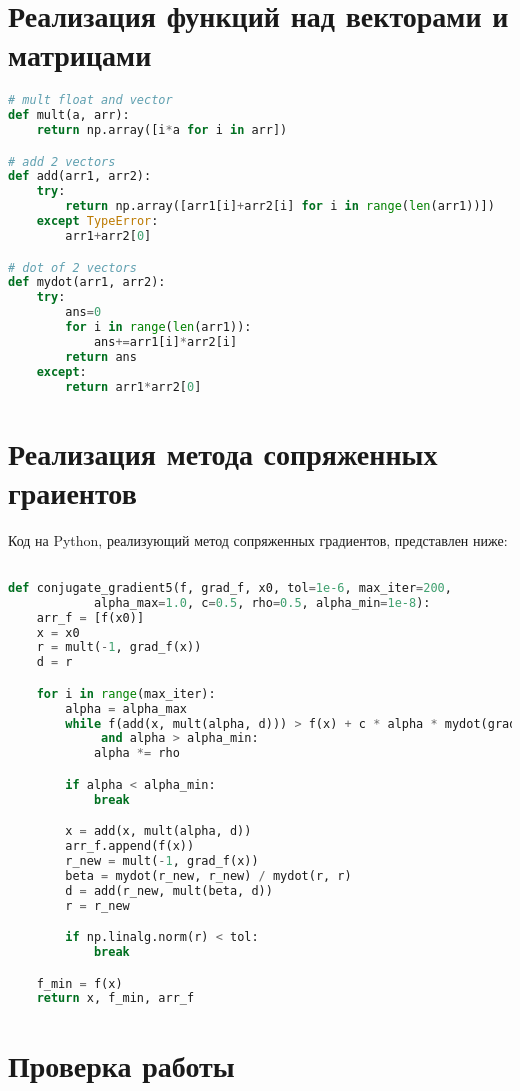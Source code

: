 \documentclass{article}
\begin{document}
\newpage
\section{Реализация функций над векторами и матрицами}
\begin{lstlisting}[language=Python]
# mult float and vector
def mult(a, arr):
    return np.array([i*a for i in arr])

# add 2 vectors
def add(arr1, arr2):
    try:
        return np.array([arr1[i]+arr2[i] for i in range(len(arr1))])
    except TypeError:
        arr1+arr2[0]

# dot of 2 vectors
def mydot(arr1, arr2):
    try:
        ans=0
        for i in range(len(arr1)):
            ans+=arr1[i]*arr2[i]
        return ans
    except:
        return arr1*arr2[0]
\end{lstlisting}


\newpage
\section{Реализация метода сопряженных граиентов}
Код на Python, реализующий метод сопряженных градиентов, представлен ниже:

\begin{lstlisting}[language=Python]

def conjugate_gradient5(f, grad_f, x0, tol=1e-6, max_iter=200,
			alpha_max=1.0, c=0.5, rho=0.5, alpha_min=1e-8):
    arr_f = [f(x0)]
    x = x0
    r = mult(-1, grad_f(x))
    d = r

    for i in range(max_iter):
        alpha = alpha_max
        while f(add(x, mult(alpha, d))) > f(x) + c * alpha * mydot(grad_f(x), d)
        	 and alpha > alpha_min:
            alpha *= rho

        if alpha < alpha_min:
            break

        x = add(x, mult(alpha, d))
        arr_f.append(f(x))
        r_new = mult(-1, grad_f(x))
        beta = mydot(r_new, r_new) / mydot(r, r)
        d = add(r_new, mult(beta, d))
        r = r_new

        if np.linalg.norm(r) < tol:
            break

    f_min = f(x)
    return x, f_min, arr_f

\end{lstlisting}

\newpage
\section{Проверка работы}
\end{document}
